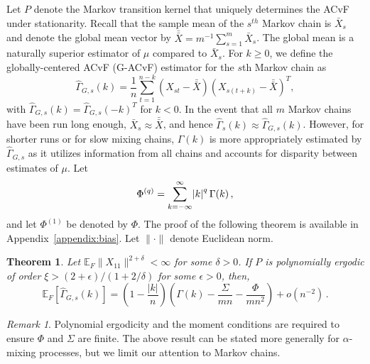 \documentclass[11pt]{article}
\newcommand{\E}{\mathbb{E}}
\newtheorem{theorem}{Theorem}
\theoremstyle{remark}
\newtheorem{remark}{Remark}
\begin{document}
Let $P$ denote the Markov transition kernel that uniquely determines the ACvF under stationarity. Recall that the sample mean of the $s^{th}$ Markov chain is $\bar{X}_s$ and denote the global mean vector by $\bar{\bar{X}} = m^{-1}\sum_{s = 1}^{m}\bar{X}_s$. The global mean is a naturally superior estimator of $\mu$ compared to $\bar{X}_s$. For $k \geq 0$, we define the globally-centered ACvF (G-ACvF) estimator for the $s${th} Markov chain as
%
\begin{equation} \label{eq:G-ACvF}
    \hat{\Gamma}_{G,s}(k) = \dfrac{1}{n} \sum_{t=1}^{n-k}(X_{st}-\bar{\bar{X}})(X_{s(t+k)}-\bar{\bar{X}})^T,
\end{equation}
with $\hat{\Gamma}_{G,s}(k) = \hat{\Gamma}_{G,s}(-k)^T$ for $k < 0$. In the event that all $m$ Markov chains have been run long enough, $\bar{X}_s \approx \bar{\bar{X}}$, and hence  $\hat{\Gamma}_{s} (k) \approx \hat{\Gamma}_{G,s}(k)$. However, for shorter runs or for slow mixing chains, $\Gamma(k)$ is more appropriately estimated by $\hat{\Gamma}_{G,s}$ as it utilizes information from all chains and accounts for disparity between estimates of $\mu$. 
Let 
\begin{equation*}
\Phi^{(q)} = \sum_{ k= -\infty}^{\infty}\abs{k}^q \Gamma(k)\,,  
\end{equation*}
%
and let $\Phi^{(1)}$ be denoted by $\Phi$.  The proof of the following theorem is available in Appendix~\ref{appendix:bias}. Let $\|\cdot\|$ denote Euclidean norm. 


\begin{theorem} \label{th:G-ACF_bias} Let $\E_F \|X_{11}\|^{2 + \delta} < \infty$ for some $\delta > 0$. If $P$ is polynomially ergodic of order $\xi > (2 + \epsilon)/(1 + 2/\delta)$ for some $\epsilon > 0$,  then,
\[
   \mathbb{E}_F\left[\hat{\Gamma}_{G,s}(k) \right] = \left(1- \dfrac{|k|}{n}\right) \left(\Gamma(k) - \dfrac{\Sigma}{mn} - \dfrac{\Phi}{mn^2}\right)  + o \left(n^{-2} \right)\,.
\]
\end{theorem}


\begin{remark}
Polynomial ergodicity and the moment conditions are required to ensure $\Phi$ and $\Sigma$ are finite. The above result can be stated more generally for $\alpha$-mixing processes, but we limit our attention to Markov chains. 
\end{remark}
\end{document}
